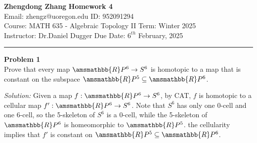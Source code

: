 \documentclass[a4paper, 12pt]{article}
\newenvironment{problem}[2][Problem]
    { \begin{mdframed}[backgroundcolor=gray!20] \textbf{#1 #2} \\}
    {  \end{mdframed}}
\newenvironment{solution}
    {\textit{Solution:}}
    {}
\renewcommand{\mathbb}{\amsmathbb}
\begin{document}
\noindent
\large\textbf{Zhengdong Zhang} \hfill \textbf{Homework 4}   \\
Email: zhengz@uoregon.edu \hfill ID: 952091294 \\
\normalsize Course: MATH 635 - Algebraic Topology II \hfill Term: Winter 2025\\
Instructor: Dr.Daniel Dugger \hfill Due Date: $6^{th}$ February, 2025 \\
\noindent\rule{7in}{2.8pt}

\begin{problem}{1}
Prove that every map \(\mathbb{R}P^6\rightarrow S^6\) is homotopic to a map that is constant on the subspace \(\mathbb{R}P^5\subseteq \mathbb{R}P^6\).
\end{problem}
\begin{solution}
Given a map \(f:\mathbb{R}P^6\rightarrow S^6\), by CAT, \(f\) is homotopic to a cellular map \(f':\mathbb{R}P^6\rightarrow S^6\). Note that \(S^6\) has only one 0-cell and one 6-cell, so the 5-skeleton 
of \(S^6\) is a 0-cell, while the 5-skeleton of \(\mathbb{R}P^6\) is homeomorphic to \(\mathbb{R}P^5\). the cellularity implies that \(f'\) is constant on \(\mathbb{R}P^5\subseteq \mathbb{R}P^6\).
\end{solution}
\end{document}
